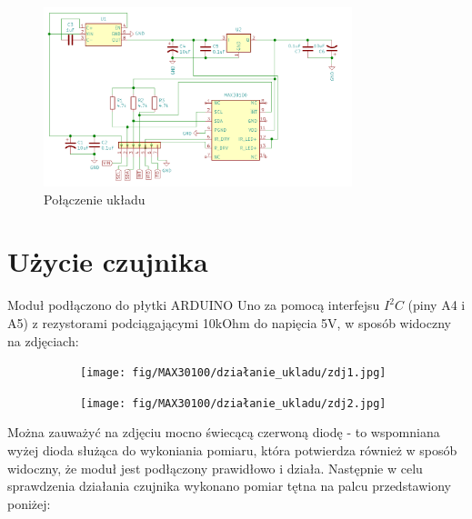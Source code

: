 \documentclass[11pt, a4paper]{article}
\begin{document}
\begin{figure}[h]
    \centering
    \includegraphics[width=0.8\textwidth]{fig/MAX30100/polaczenie_modulu/schemat.png}
    \caption{Połączenie układu}
    \label{fig:polaczenie_ukladu}
\end{figure}



\section{Użycie czujnika}

Moduł podłączono do płytki ARDUINO Uno za pomocą interfejsu $I^2C$ (piny A4 i A5) z rezystorami podciągającymi 10kOhm do napięcia 5V,  w sposób widoczny na zdjęciach:
\begin{figure}[h]
\begin{subfigure}{.5\textwidth}
\centering
\texttt{[image: fig/MAX30100/działanie\_ukladu/zdj1.jpg]}
\label{fig:_zdjecie_elementu}
\end{subfigure}%
\begin{subfigure}{.5\textwidth}
\centering
\texttt{[image: fig/MAX30100/działanie\_ukladu/zdj2.jpg]}
\label{fig:_zasada_dzialania_elementu}
\end{subfigure}
\end{figure}

Można zauważyć na zdjęciu mocno świecącą czerwoną diodę - to wspomniana wyżej dioda służąca do wykoniania pomiaru, która potwierdza również w sposób widoczny, że moduł jest podłączony prawidłowo i działa. Następnie w celu sprawdzenia działania czujnika wykonano pomiar tętna na palcu przedstawiony poniżej: 
\end{document}
